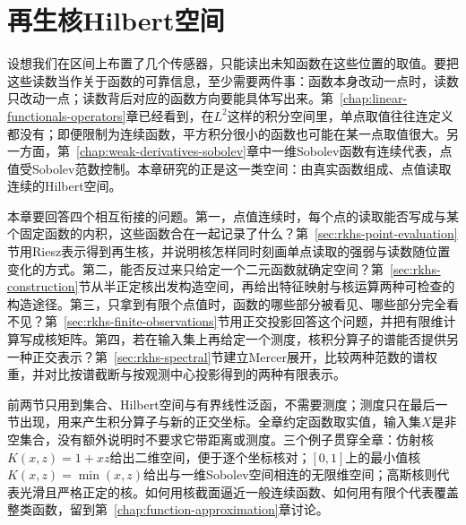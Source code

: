 \chapter{再生核Hilbert空间}
\label{chap:rkhs}

设想我们在区间上布置了几个传感器，只能读出未知函数在这些位置的取值。要把这些读数当作关于函数的可靠信息，至少需要两件事：函数本身改动一点时，读数只改动一点；读数背后对应的函数方向要能具体写出来。第~\ref{chap:linear-functionals-operators}章已经看到，在$L^2$这样的积分空间里，单点取值往往连定义都没有；即便限制为连续函数，平方积分很小的函数也可能在某一点取值很大。另一方面，第~\ref{chap:weak-derivatives-sobolev}章中一维Sobolev函数有连续代表，点值受Sobolev范数控制。本章研究的正是这一类空间：由真实函数组成、点值读取连续的Hilbert空间。

本章要回答四个相互衔接的问题。第一，点值连续时，每个点的读取能否写成与某个固定函数的内积，这些函数合在一起记录了什么？第~\ref{sec:rkhs-point-evaluation}节用Riesz表示得到再生核，并说明核怎样同时刻画单点读取的强弱与读数随位置变化的方式。第二，能否反过来只给定一个二元函数就确定空间？第~\ref{sec:rkhs-construction}节从半正定核出发构造空间，再给出特征映射与核运算两种可检查的构造途径。第三，只拿到有限个点值时，函数的哪些部分被看见、哪些部分完全看不见？第~\ref{sec:rkhs-finite-observations}节用正交投影回答这个问题，并把有限维计算写成核矩阵。第四，若在输入集上再给定一个测度，核积分算子的谱能否提供另一种正交表示？第~\ref{sec:rkhs-spectral}节建立Mercer展开，比较两种范数的谱权重，并对比按谱截断与按观测中心投影得到的两种有限表示。

前两节只用到集合、Hilbert空间与有界线性泛函，不需要测度；测度只在最后一节出现，用来产生积分算子与新的正交坐标。全章约定函数取实值，输入集$X$是非空集合，没有额外说明时不要求它带距离或测度。三个例子贯穿全章：仿射核$K(x,z)=1+xz$给出二维空间，便于逐个坐标核对；$[0,1]$上的最小值核$K(x,z)=\min(x,z)$给出与一维Sobolev空间相连的无限维空间；高斯核则代表光滑且严格正定的核。如何用核截面逼近一般连续函数、如何用有限个代表覆盖整类函数，留到第~\ref{chap:function-approximation}章讨论。






